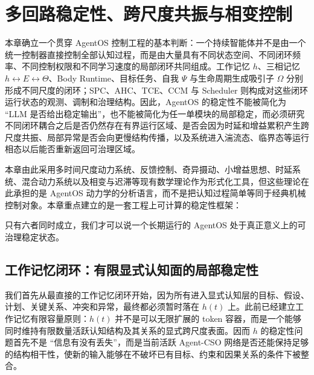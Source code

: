 \chapter{多回路稳定性、跨尺度共振与相变控制}
\label{chap:multiloop_stability_phase_control}

\begin{chapterlead}
本章确立一个贯穿 AgentOS 控制工程的基本判断：一个持续智能体并不是由一个统一控制器直接控制全部认知过程，而是由大量具有不同状态空间、不同闭环频率、不同控制权限和不同学习速度的局部闭环共同组成。工作记忆 $h$、三相记忆 $h\leftrightarrow E\leftrightarrow\Theta$、Body Runtime、目标任务、自我 $\Psi$ 与生命周期生成吸引子 $\Omega$ 分别形成不同尺度的闭环；SPC、AHC、TCE、CCM 与 Scheduler 则构成对这些闭环运行状态的观测、调制和治理结构。因此，AgentOS 的稳定性不能被简化为 ``LLM 是否给出稳定输出''，也不能被简化为任一单模块的局部稳定，而必须研究不同闭环耦合之后是否仍然存在有界运行区域、是否会因为时延和增益累积产生跨尺度共振、局部异常是否会向更慢结构传播，以及系统进入湍流态、临界态等运行相态以后能否重新返回可治理区域。

本章由此采用多时间尺度动力系统、反馈控制、奇异摄动、小增益思想、时延系统、混合动力系统以及相变与迟滞等现有数学理论作为形式化工具，但这些理论在此承担的是 AgentOS 动力学的分析语言，而不是把认知过程简单等同于经典机械控制对象。本章重点建立的是一套工程上可计算的稳定性框架：
\begin{statementbox}
\centering
{}
\end{statementbox}
只有六者同时成立，我们才可以说一个长期运行的 AgentOS 处于真正意义上的可治理稳定状态。
\end{chapterlead}


\section{工作记忆闭环：有限显式认知面的局部稳定性}

我们首先从最直接的工作记忆闭环开始，因为所有进入显式认知层的目标、假设、计划、关键关系、冲突和异常，最终都必须暂时落在 $h(t)$ 上。此前已经建立工作记忆有限容量原则：$h(t)$ 并不是可以无限扩展的 token 容器，而是一个能够同时维持有限数量活跃认知结构及其关系的显式跨尺度表面。因而 $h$ 的稳定性问题首先不是 ``信息有没有丢失''，而是当前活跃 Agent-CSO 网络是否还能保持足够的结构相干性，使新的输入能够在不破坏已有目标、约束和因果关系的条件下被整合。

